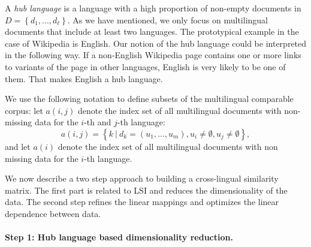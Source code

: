 \documentclass[twoside,11pt]{article}
\begin{document}
A \emph{hub language} is a language with a high proportion of non-empty documents in $D = \left\{d_1,..., d_{\ell}\right\}$. As we have mentioned, we only focus on multilingual documents that include at least two languages. The prototypical example in the case of Wikipedia is English. Our notion of the hub language could be interpreted in the following way.
If a non-English Wikipedia page contains one or more links to variants of the page in other languages, English is very likely to be one of them. That makes English a hub language.

We use the following notation to define subsets of the multilingual comparable corpus: let $a(i,j)$ denote the index set of all multilingual documents with non-missing data for the $i$-th and $j$-th language:  $$a(i,j) = \left\{k~ |~ d_k = (u_1,...,u_m), u_i \neq \emptyset, u_j \neq \emptyset \right\},$$ and let $a(i)$ denote the index set of all multilingual documents with non missing data for the $i$-th language.

We now describe a two step approach to building a cross-lingual similarity matrix. The first part is related to LSI and reduces the dimensionality of the data. The second step refines the linear mappings and optimizes the linear dependence between data.

\paragraph{Step 1: Hub language based dimensionality reduction.}
\end{document}
